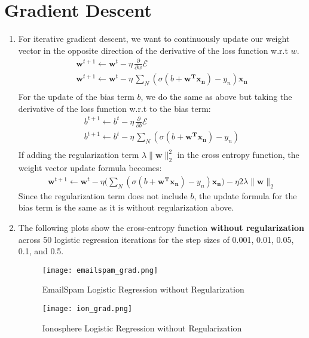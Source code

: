 \documentclass[12pt]{article}
\begin{document}
\section{Gradient Descent}
\begin{enumerate}[label=\alph*.]
	\item For iterative gradient descent, we want to continuously update our weight vector in the opposite direction of the derivative of the loss function w.r.t $w$. 
	\begin{gather*}
		\mathbf{w}^{t+1} \leftarrow \mathbf{w}^{t} - \eta \, \frac{\partial}{\partial w} \mathcal{E} \\
		\mathbf{w}^{t+1} \leftarrow \mathbf{w}^{t} - \eta \, \sum_N{(\sigma(b + \mathbf{w^T x_n}) - y_n) \mathbf{x_n}} \\
	\end{gather*}
	For the update of the bias term $b$, we do the same as above but taking the derivative of the loss function w.r.t to the bias term:
	\begin{gather*}
		b^{t+1} \leftarrow b^t - \eta \, \frac{\partial}{\partial b} \mathcal{E} \\
		b^{t+1} \leftarrow b^t - \eta \, \sum_N{(\sigma(b + \mathbf{w^T x_n}) - y_n)} \\
	\end{gather*}
	If adding the regularization term $\lambda \lVert \mathbf{w} \rVert_2^2$ in the cross entropy function, the weight vector update formula becomes:
	\begin{gather*}
		\mathbf{w}^{t+1} \leftarrow \mathbf{w}^{t} - \eta \bigg( \sum_N{ (\sigma(b + \mathbf{w^T x_n}) - y_n) \mathbf{x_n}}\bigg) - \eta 2 \lambda \lVert \mathbf{w} \rVert_2 
	\end{gather*}
	Since the regularization term does not include $b$, the update formula for the bias term is the same as it is without regularization above.

	\item The following plots show the cross-entropy function \textbf{without regularization} across 50 logistic regression iterations for the step sizes of 0.001, 0.01, 0.05, 0.1, and 0.5.  

	\begin{figure}[bp!]
	  \caption{EmailSpam Logistic Regression without Regularization}
	  \centering
	    \texttt{[image: emailspam\_grad.png]}
	\end{figure}

	\begin{figure}[bp!]
	  \caption{Ionosphere Logistic Regression without Regularization}
	  \centering
	    \texttt{[image: ion\_grad.png]}
	\end{figure}


\end{enumerate}
\end{document}
